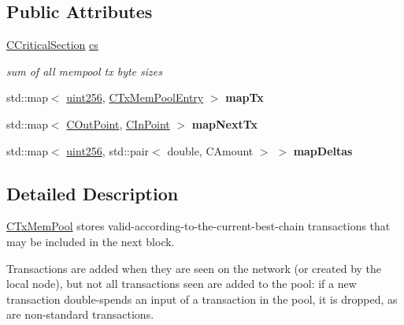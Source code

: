 \subsection*{Public Attributes}
\begin{DoxyCompactItemize}
\item 
\mbox{\label{class_c_tx_mem_pool_ac7ee8c06837c7d2688e2d7e3d071bdbb}} 
\mbox{\hyperlink{class_annotated_mixin}{C\+Critical\+Section}} \mbox{\hyperlink{class_c_tx_mem_pool_ac7ee8c06837c7d2688e2d7e3d071bdbb}{cs}}
\begin{DoxyCompactList}\small\item\em sum of all mempool tx\textquotesingle{} byte sizes \end{DoxyCompactList}\item 
\mbox{\label{class_c_tx_mem_pool_a5cd374a559b02a6485ca8cef769f9930}} 
std\+::map$<$ \mbox{\hyperlink{classuint256}{uint256}}, \mbox{\hyperlink{class_c_tx_mem_pool_entry}{C\+Tx\+Mem\+Pool\+Entry}} $>$ {\bfseries map\+Tx}
\item 
\mbox{\label{class_c_tx_mem_pool_aae6f1162f0b2e42b369971f32a9f71e8}} 
std\+::map$<$ \mbox{\hyperlink{class_c_out_point}{C\+Out\+Point}}, \mbox{\hyperlink{class_c_in_point}{C\+In\+Point}} $>$ {\bfseries map\+Next\+Tx}
\item 
\mbox{\label{class_c_tx_mem_pool_a341709e31a39ce7a7a951a85c775c589}} 
std\+::map$<$ \mbox{\hyperlink{classuint256}{uint256}}, std\+::pair$<$ double, C\+Amount $>$ $>$ {\bfseries map\+Deltas}
\end{DoxyCompactItemize}


\subsection{Detailed Description}
\mbox{\hyperlink{class_c_tx_mem_pool}{C\+Tx\+Mem\+Pool}} stores valid-\/according-\/to-\/the-\/current-\/best-\/chain transactions that may be included in the next block.

Transactions are added when they are seen on the network (or created by the local node), but not all transactions seen are added to the pool\+: if a new transaction double-\/spends an input of a transaction in the pool, it is dropped, as are non-\/standard transactions. 

